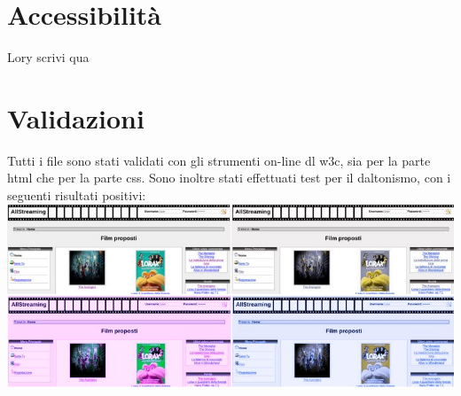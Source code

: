 \section{Accessibilità}
Lory scrivi qua

\section{Validazioni}
Tutti i file sono stati validati con gli strumenti on-line dl w3c, sia per la parte html che per la parte css.
Sono inoltre stati effettuati test per il daltonismo, con i seguenti risultati positivi: 
\includegraphics[scale=0.55]{images/test}





